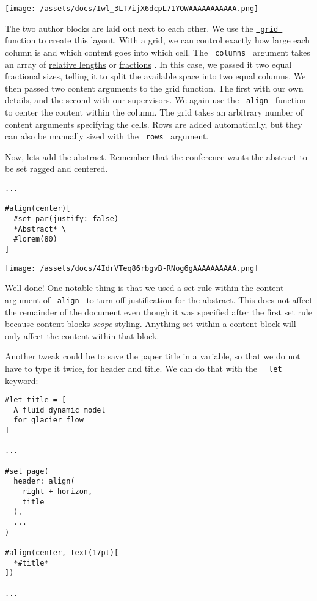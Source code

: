 \texttt{[image: /assets/docs/Iwl\_3LT7ijX6dcpL71YOWAAAAAAAAAAA.png]}

The two author blocks are laid out next to each other. We use the
\href{/docs/reference/layout/grid/}{\texttt{\ grid\ }} function to
create this layout. With a grid, we can control exactly how large each
column is and which content goes into which cell. The
\texttt{\ columns\ } argument takes an array of
\href{/docs/reference/layout/relative/}{relative lengths} or
\href{/docs/reference/layout/fraction/}{fractions} . In this case, we
passed it two equal fractional sizes, telling it to split the available
space into two equal columns. We then passed two content arguments to
the grid function. The first with our own details, and the second with
our supervisors\textquotesingle. We again use the \texttt{\ align\ }
function to center the content within the column. The grid takes an
arbitrary number of content arguments specifying the cells. Rows are
added automatically, but they can also be manually sized with the
\texttt{\ rows\ } argument.

Now, let\textquotesingle s add the abstract. Remember that the
conference wants the abstract to be set ragged and centered.

\begin{verbatim}
...

#align(center)[
  #set par(justify: false)
  *Abstract* \
  #lorem(80)
]
\end{verbatim}

\texttt{[image: /assets/docs/4IdrVTeq86rbgvB-RNog6gAAAAAAAAAA.png]}

Well done! One notable thing is that we used a set rule within the
content argument of \texttt{\ align\ } to turn off justification for the
abstract. This does not affect the remainder of the document even though
it was specified after the first set rule because content blocks
\emph{scope} styling. Anything set within a content block will only
affect the content within that block.

Another tweak could be to save the paper title in a variable, so that we
do not have to type it twice, for header and title. We can do that with
the \texttt{\ }{\texttt{\ let\ }}\texttt{\ } keyword:

\begin{verbatim}
#let title = [
  A fluid dynamic model
  for glacier flow
]

...

#set page(
  header: align(
    right + horizon,
    title
  ),
  ...
)

#align(center, text(17pt)[
  *#title*
])

...
\end{verbatim}

